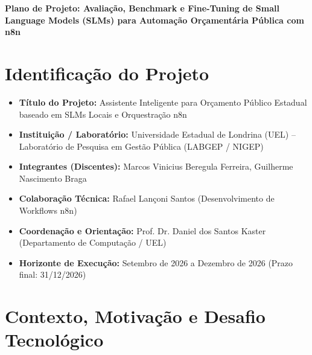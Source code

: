 \documentclass[11pt]{article}
\begin{document}
\begin{center}
    \Large\textbf{Plano de Projeto: Avaliação, Benchmark e Fine-Tuning de Small Language Models (SLMs) para Automação Orçamentária Pública com n8n}
\end{center}

\medskip

\section*{Identificação do Projeto}

\begin{itemize}
    \item \textbf{Título do Projeto:} Assistente Inteligente para Orçamento Público Estadual baseado em SLMs Locais e Orquestração n8n
    \item \textbf{Instituição / Laboratório:} Universidade Estadual de Londrina (UEL) -- Laboratório de Pesquisa em Gestão Pública (LABGEP / NIGEP)
    \item \textbf{Integrantes (Discentes):} Marcos Vinicius Beregula Ferreira, Guilherme Nascimento Braga
    \item \textbf{Colaboração Técnica:} Rafael Lançoni Santos (Desenvolvimento de Workflows n8n)
    \item \textbf{Coordenação e Orientação:} Prof. Dr. Daniel dos Santos Kaster (Departamento de Computação / UEL)
    \item \textbf{Horizonte de Execução:} Setembro de 2026 a Dezembro de 2026 (Prazo final: 31/12/2026)
\end{itemize}

\section{Contexto, Motivação e Desafio Tecnológico}
\end{document}
